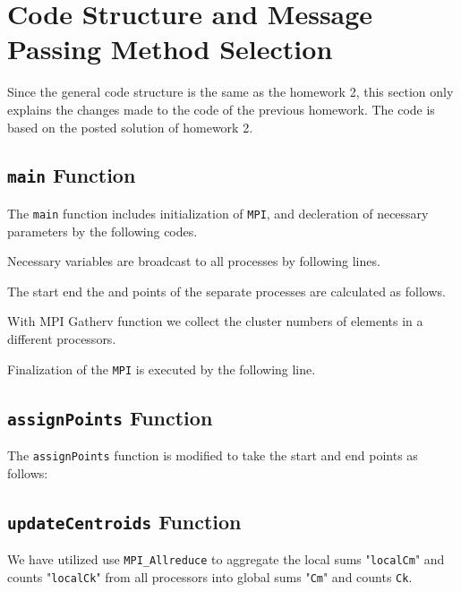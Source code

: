 \section{Code Structure and Message Passing Method Selection}
Since the general code structure is the same as the homework 2, this section only explains the changes made to the code of the previous homework. The code is based on the posted solution of homework 2.

\subsection{\texttt{main} Function}
The \texttt{main} function includes initialization of \texttt{MPI}, and decleration of necessary parameters by the following codes.

Necessary variables are broadcast to all processes by following lines.



The start end the and points of the separate processes are calculated  as follows.


With MPI Gatherv function we collect the cluster numbers of elements in a different processors.





 Finalization of the \texttt{MPI} is executed by the following line.



 
\subsection{\texttt{assignPoints} Function}
The \texttt{assignPoints} function is modified to take the start and end points as follows:



\subsection{\texttt{updateCentroids} Function}


We have utilized use \texttt{MPI\_Allreduce} to aggregate the local sums "\texttt{localCm}" and counts "\texttt{localCk}" from all processors into global sums "\texttt{Cm}" and counts 
\texttt{Ck}.

